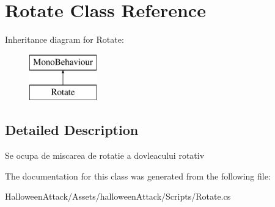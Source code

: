 \hypertarget{class_rotate}{}\section{Rotate Class Reference}
\label{class_rotate}
Inheritance diagram for Rotate\+:\begin{figure}[H]
\begin{center}
\leavevmode
\includegraphics[height=2.000000cm]{class_rotate}
\end{center}
\end{figure}


\subsection{Detailed Description}
Se ocupa de miscarea de rotatie a dovleacului rotativ 

The documentation for this class was generated from the following file\+:\begin{DoxyCompactItemize}
\item 
Halloween\+Attack/\+Assets/halloween\+Attack/\+Scripts/Rotate.\+cs\end{DoxyCompactItemize}
